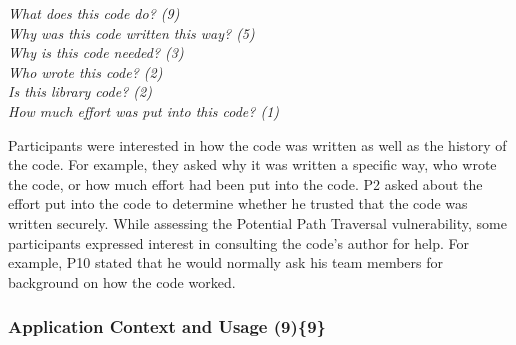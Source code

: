 \documentclass{acm_proc_article-sp}
\begin{document}
\noindent\emph{What does this code do? (9)} \\
\emph{Why was this code written this way? (5)} \\
\emph{Why is this code needed? (3)} \\
\emph{Who wrote this code? (2)} \\
\emph{Is this library code? (2)} \\
\emph{How much effort was put into this code? (1)}


 
Participants were interested in how the code was written as well as the history of the code.
For example, they asked why it was written a specific way, who wrote the code, or how much effort had been put into the code.
P2 asked about the effort put into the code to determine whether he trusted that the code was written securely.
While assessing the Potential Path Traversal vulnerability, some participants expressed interest in consulting the code's author for help.
For example, P10 stated that he would normally ask his team members for background on how the code worked.



% 


\subsubsection{\textbf{Application Context and Usage (9)\{9\}}}\label{acu}
\end{document}
